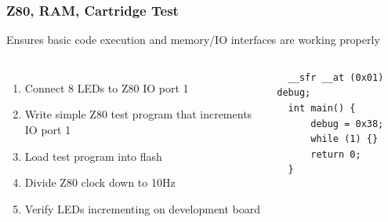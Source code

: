 \documentclass[xcolor=table]{beamer}
\newlength{\wideitemsep}
\let\olditem\item
\renewcommand{\item}{\setlength{\itemsep}{\wideitemsep}\olditem}
\begin{document}
\begin{frame}[fragile]
    \frametitle{Z80, RAM, Cartridge Test}
    Ensures basic code execution and memory/IO interfaces are working properly
    \vspace{\baselineskip}
    \begin{columns}[c]
        \begin{enumerate}
            \item Connect 8 LEDs to Z80 IO port 1
            \item Write simple Z80 test program that increments IO port 1
            \item Load test program into flash
            \item Divide Z80 clock down to 10Hz
            \item Verify LEDs incrementing on development board
        \end{enumerate}
        \begin{lstlisting}
  __sfr __at (0x01) debug;
  int main() {
      debug = 0x38;
      while (1) {}
      return 0;
  }
        \end{lstlisting}
    \end{columns}
\end{frame}
\end{document}
